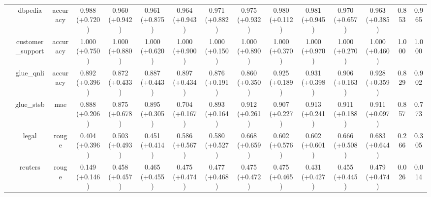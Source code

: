 \begin{landscape}
\begin{table}[ht]
{\begin{tabular}{ccccccccccccccc}
                                   & dbpedia                        & accuracy                         & 0.988 (+0.720)     & 0.960 (+0.942)    & 0.961 (+0.875)             & 0.964 (+0.943)    & 0.971 (+0.882)             & 0.975 (+0.932)      & 0.980 (+0.112)           & 0.981 (+0.945)      & 0.970 (+0.657)               & 0.963 (+0.385)          & 0.853                  & 0.965          \\
                                   & customer\_support              & accuracy                         & 1.000 (+0.750)     & 1.000 (+0.880)    & 1.000 (+0.620)             & 1.000 (+0.900)    & 1.000 (+0.150)             & 1.000 (+0.890)      & 1.000 (+0.370)           & 1.000 (+0.970)      & 1.000 (+0.270)               & 1.000 (+0.460)          & 1.000                  & 1.000          \\
                                   & glue\_qnli                     & accuracy                         & 0.892 (+0.396)     & 0.872 (+0.433)    & 0.887 (+0.443)             & 0.897 (+0.434)    & 0.876 (+0.191)             & 0.860 (+0.350)      & 0.925 (+0.189)           & 0.931 (+0.398)      & 0.906 (+0.163)               & 0.928 (+0.359)          & 0.829                  & 0.902          \\
                                   & glue\_stsb                     & mae                              & 0.888 (+0.206)     & 0.875 (+0.678)    & 0.895 (+0.305)             & 0.704 (+0.167)    & 0.893 (+0.164)             & 0.912 (+0.261)      & 0.907 (+0.227)           & 0.913 (+0.241)      & 0.911 (+0.188)               & 0.911 (+0.097)          & 0.857                  & 0.773          \\
                                   & legal                          & rouge                            & 0.404 (+0.396)     & 0.503 (+0.493)    & 0.451 (+0.414)             & 0.586 (+0.567)    & 0.580 (+0.527)             & 0.668 (+0.659)      & 0.602 (+0.576)           & 0.602 (+0.601)      & 0.666 (+0.508)               & 0.683 (+0.644)          & 0.266                  & 0.305          \\
                                   & reuters                        & rouge                            & 0.149 (+0.146)     & 0.458 (+0.457)    & 0.465 (+0.455)             & 0.475 (+0.474)    & 0.477 (+0.468)             & 0.475 (+0.472)      & 0.475 (+0.465)           & 0.431 (+0.427)      & 0.455 (+0.445)               & 0.479 (+0.474)          & 0.026                  & 0.014          \\

\end{tabular}}
\end{table}
\end{landscape}
